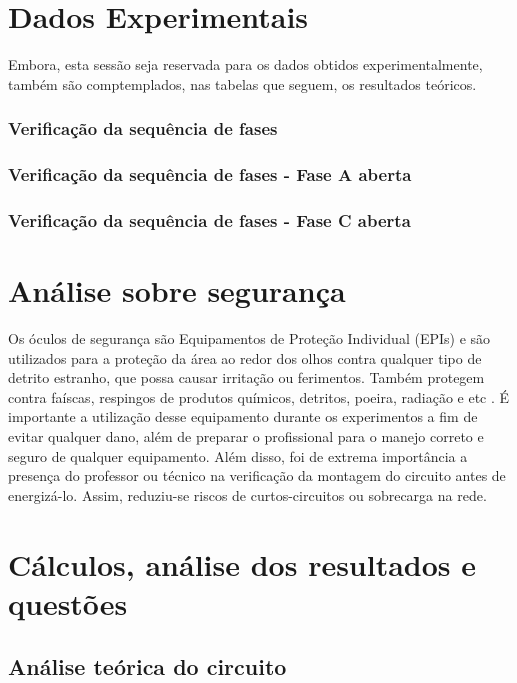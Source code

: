 \documentclass[a4paper,12pt,oneside,openany,table,xcdraw]{article}
\begin{document}
\section{Dados Experimentais}
Embora, esta sessão seja reservada para os dados obtidos experimentalmente, também são comptemplados, nas tabelas que seguem, os resultados teóricos.

\subsubsection{Verificação da sequência de fases}


\subsubsection{Verificação da sequência de fases - Fase A aberta}

\subsubsection{Verificação da sequência de fases - Fase C aberta}




\section{Análise sobre segurança} %
Os óculos de segurança são Equipamentos de Proteção Individual (EPIs) e são utilizados para a proteção da área ao redor dos olhos contra qualquer tipo de detrito estranho, que possa causar irritação ou ferimentos. Também protegem contra faíscas, respingos de produtos químicos, detritos, poeira, radiação e etc \cite{safe}.
É importante a utilização desse equipamento durante os experimentos a fim de evitar qualquer dano, além de preparar o profissional para o manejo correto e seguro de qualquer equipamento.
Além disso, foi de extrema importância a presença do professor ou técnico na verificação da montagem do circuito antes de energizá-lo. Assim, reduziu-se riscos de curtos-circuitos ou sobrecarga na rede.


\section{Cálculos, análise dos resultados e questões} %
\subsection{Análise teórica do circuito} \label{m1:teorico}
\end{document}
